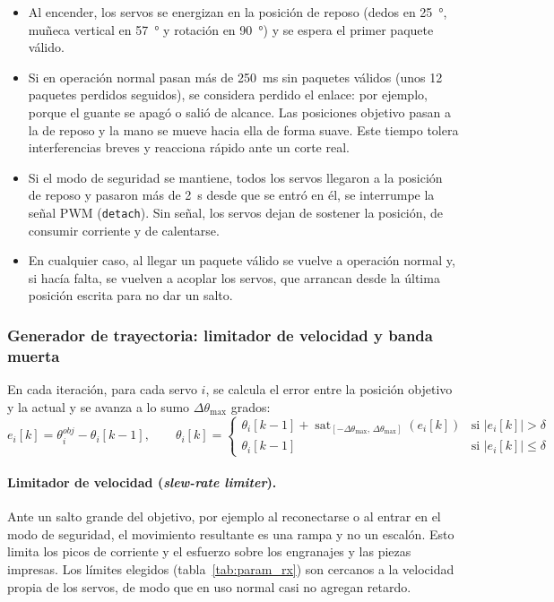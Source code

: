 \begin{itemize}
    \item Al encender, los servos se energizan en la posición de reposo (dedos en \SI{25}{\degree}, muñeca vertical en \SI{57}{\degree} y rotación en \SI{90}{\degree}) y se espera el primer paquete válido.
    \item Si en operación normal pasan más de \SI{250}{\milli\second} sin paquetes válidos (unos 12 paquetes perdidos seguidos), se considera perdido el enlace: por ejemplo, porque el guante se apagó o salió de alcance. Las posiciones objetivo pasan a la de reposo y la mano se mueve hacia ella de forma suave. Este tiempo tolera interferencias breves y reacciona rápido ante un corte real.
    \item Si el modo de seguridad se mantiene, todos los servos llegaron a la posición de reposo y pasaron más de \SI{2}{\second} desde que se entró en él, se interrumpe la señal PWM (\texttt{detach}). Sin señal, los servos dejan de sostener la posición, de consumir corriente y de calentarse.
    \item En cualquier caso, al llegar un paquete válido se vuelve a operación normal y, si hacía falta, se vuelven a acoplar los servos, que arrancan desde la última posición escrita para no dar un salto.
\end{itemize}

\subsubsection{Generador de trayectoria: limitador de velocidad y banda muerta}
\label{sec:slew}

En cada iteración, para cada servo $i$, se calcula el error entre la posición objetivo y la actual y se avanza a lo sumo $\Delta\theta_{\max}$ grados:
\begin{equation}
e_i[k] = \theta^{obj}_i - \theta_i[k-1], \qquad
\theta_i[k] =
\begin{cases}
\theta_i[k-1] + \operatorname{sat}_{[-\Delta\theta_{\max},\,\Delta\theta_{\max}]}\left(e_i[k]\right) & \text{si } |e_i[k]| > \delta \\
\theta_i[k-1] & \text{si } |e_i[k]| \leq \delta
\end{cases}
\end{equation}

\paragraph{Limitador de velocidad (\textit{slew-rate limiter}).} Ante un salto grande del objetivo, por ejemplo al reconectarse o al entrar en el modo de seguridad, el movimiento resultante es una rampa y no un escalón. Esto limita los picos de corriente y el esfuerzo sobre los engranajes y las piezas impresas. Los límites elegidos (tabla~\ref{tab:param_rx}) son cercanos a la velocidad propia de los servos, de modo que en uso normal casi no agregan retardo.

